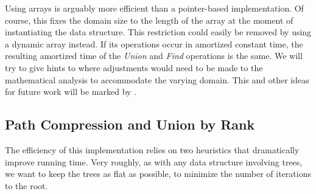 \documentclass[headsepline,footsepline,footinclude=false,oneside,fontsize=11pt,paper=a4,listof=totoc,bibliography=totoc]{scrbook} %
\begin{document}
Using arrays is arguably more efficient than a pointer-based implementation. Of course, this fixes the domain size to the length of the array at the moment of instantiating the data structure. This restriction could easily be removed by using a dynamic array instead. If its operations occur in amortized constant time, the resulting amortized time of the \textit{Union} and \textit{Find} operations is the same. We will try to give hints to where adjustments would need to be made to the mathematical analysis to accommodate the varying domain. This and other ideas for future work will be marked by \HandPencilLeft. 

\subsection{Path Compression and Union by Rank}

The efficiency of this implementation relies on two heuristics that dramatically improve running time. Very roughly, as with any data structure involving trees, we want to keep the trees as flat as possible, to minimize the number of iterations to the root.
\end{document}
